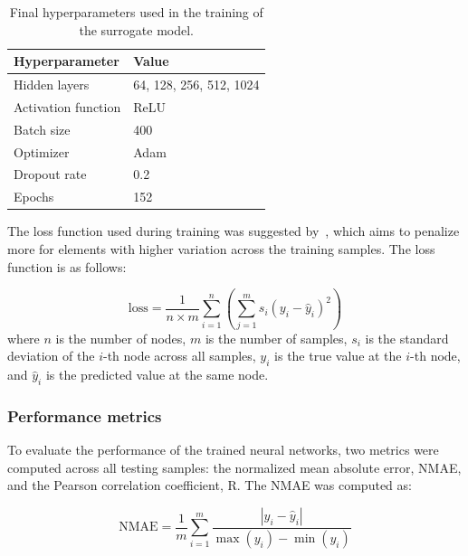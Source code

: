 \documentclass[a4paper,fleqn]{cas-sc}
\begin{document}
    \begin{table}
    \centering
    \caption{Final hyperparameters used in the training of the surrogate model.}
    \label{tab:final_hyperparams}
    \begin{tabular}{@{}ll@{}}
    \toprule
    \textbf{Hyperparameter}     & \textbf{Value}          \\ \midrule
    Hidden layers           & 64, 128, 256, 512, 1024 \\
    Activation function         & ReLU                    \\
    Batch size                  & 400                     \\
    Optimizer                   & Adam                    \\
    Dropout rate                & 0.2                     \\
    Epochs                      & 152                     \\
    \bottomrule
    \end{tabular}
    \end{table}

    The loss function used during training was suggested by~\citet{Ghazi2021}, which aims to penalize more for elements with higher variation across the training samples. The loss function is as follows:

    \begin{equation}
      \mathrm{loss} = \frac{1}{n \times m} \sum_{i=1}^{n} \left( \sum_{j=1}^{m} s_i \left( y_i - \hat{y}_i \right)^2 \right)
    \end{equation}
    \noindent where $n$ is the number of nodes, $m$ is the number of samples, $s_i$ is the standard deviation of the $i$-th node across all samples, $y_i$ is the true value at the $i$-th node, and $\hat{y}_i$ is the predicted value at the same node.

  \subsubsection{Performance metrics}
    To evaluate the performance of the trained neural networks, two metrics were computed across all testing samples: the normalized mean absolute error, NMAE, and the Pearson correlation coefficient, R. The NMAE was computed as:

    \begin{equation}
      \mathrm{NMAE} = \frac{1}{m} \sum_{i=1}^{m} \frac{|y_i - \hat{y}_i|}{\max(y_i) - \min(y_i)}
    \end{equation}
      
\end{document}
